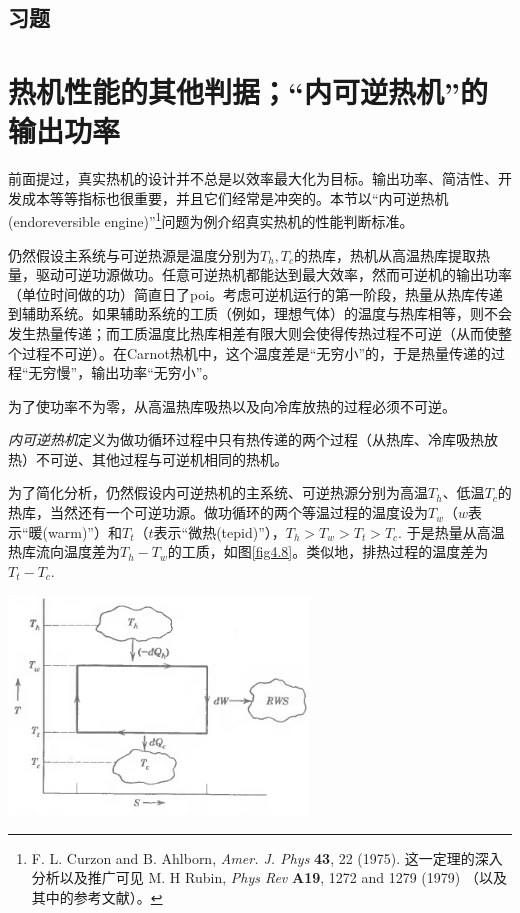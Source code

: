 \subsection*{习题}

\section{热机性能的其他判据；“内可逆热机”的输出功率}
\label{sec4.9}
前面提过，真实热机的设计并不总是以效率最大化为目标。输出功率、简洁性、开发成本等等指标也很重要，并且它们经常是冲突的。本节以“内可逆热机(endoreversible engine)”\footnote{F. L. Curzon and B. Ahlborn,  {\it Amer. J. Phys} {\bf 43}, 22 (1975). 这一定理的深入分析以及推广可见 M. H Rubin, {\it Phys Rev}  {\bf A19},  1272 and 1279 (1979)  （以及其中的参考文献）。}问题为例介绍真实热机的性能判断标准。

仍然假设主系统与可逆热源是温度分别为$T_h, T_c$的热库，热机从高温热库提取热量，驱动可逆功源做功。任意可逆热机都能达到最大效率，然而可逆机的输出功率（单位时间做的功）简直日了poi。考虑可逆机运行的第一阶段，热量从热库传递到辅助系统。如果辅助系统的工质（例如，理想气体）的温度与热库相等，则不会发生热量传递；而工质温度比热库相差有限大则会使得传热过程不可逆（从而使整个过程不可逆）。在Carnot热机中，这个温度差是“无穷小”的，于是热量传递的过程“无穷慢”，输出功率“无穷小”。

为了使功率不为零，从高温热库吸热以及向冷库放热的过程必须不可逆。

{\it 内可逆热机}定义为做功循环过程中只有热传递的两个过程（从热库、冷库吸热放热）不可逆、其他过程与可逆机相同的热机。

为了简化分析，仍然假设内可逆热机的主系统、可逆热源分别为高温$T_h$、低温$T_c$的热库，当然还有一个可逆功源。做功循环的两个等温过程的温度设为$T_w$（$w$表示“暖(warm)”）和$T_t$（$t$表示“微热(tepid)”），$T_h > T_w > T_t > T_c$. 于是热量从高温热库流向温度差为$T_h - T_w$的工质，如图\ref{fig4.8}。类似地，排热过程的温度差为$T_t - T_c$.

{
	\centering
	\includegraphics[width=0.6\textwidth]{Pictures/fig4.8.png}
	\label{fig4.8}
}

